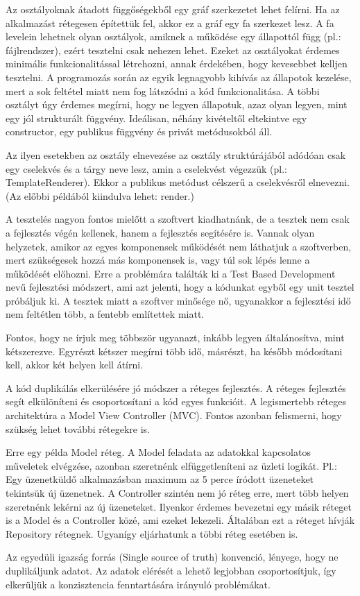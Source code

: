 \documentclass[a4paper,12pt,oneside]{report}
\begin{document}
\begin{justify}
	Az osztályoknak átadott függőségekből egy gráf szerkezetet lehet felírni. Ha az alkalmazást rétegesen építettük fel, akkor ez a gráf egy fa szerkezet lesz. A fa levelein lehetnek olyan osztályok, amiknek a működése egy állapottól függ (pl.: fájlrendszer), ezért tesztelni csak nehezen lehet. Ezeket az osztályokat érdemes minimális funkcionalitással létrehozni, annak érdekében, hogy kevesebbet kelljen tesztelni. A programozás során az egyik legnagyobb kihívás az állapotok kezelése, mert a sok feltétel miatt nem fog látszódni a kód funkcionalitása. A többi osztályt úgy érdemes megírni, hogy ne legyen állapotuk, azaz olyan legyen, mint egy jól strukturált függvény. Ideálisan, néhány kivételtől eltekintve egy constructor, egy publikus függvény és privát metódusokból áll. 

	Az ilyen esetekben az osztály elnevezése az osztály struktúrájából adódóan csak egy cselekvés és a tárgy neve lesz, amin a cselekvést végezzük (pl.: TemplateRenderer). Ekkor a publikus metódust célszerű a cselekvésről elnevezni. (Az előbbi példából kiindulva lehet: render.) 

	A tesztelés nagyon fontos mielőtt a szoftvert kiadhatnánk, de a tesztek nem csak a fejlesztés végén kellenek, hanem a fejlesztés segítésére is. Vannak olyan helyzetek, amikor az egyes komponensek működését nem láthatjuk a szoftverben, mert szükségesek hozzá más komponensek is, vagy túl sok lépés lenne a működését előhozni. Erre a problémára találták ki a Test Based Development nevű fejlesztési módszert, ami azt jelenti, hogy a kódunkat egyből egy unit tesztel próbáljuk ki. A tesztek miatt a szoftver minősége nő, ugyanakkor a fejlesztési idő nem feltétlen több, a fentebb említettek miatt.

	Fontos, hogy ne írjuk meg többször ugyanazt, inkább legyen általánosítva, mint kétszerezve. Egyrészt kétszer megírni több idő, másrészt, ha később módosítani kell, akkor két helyen kell átírni. 

    A kód duplikálás elkerülésére jó módszer a réteges fejlesztés. A réteges fejlesztés segít elkülöníteni és csoportosítani a kód egyes funkcióit. A legismertebb réteges architektúra a Model View Controller (MVC). Fontos azonban felismerni, hogy szükség lehet további rétegekre is. 
    
    Erre egy példa Model réteg. A Model feladata az adatokkal kapcsolatos műveletek elvégzése, azonban szeretnénk elfüggetleníteni az üzleti logikát. Pl.: Egy üzenetküldő alkalmazásban maximum az 5 perce íródott üzeneteket tekintsük új üzenetnek. A Controller szintén nem jó réteg erre, mert több helyen szeretnénk lekérni az új üzeneteket. Ilyenkor érdemes bevezetni egy másik réteget is a Model és a Controller közé, ami ezeket lekezeli. Általában ezt a réteget hívják Repository rétegnek. Ugyanígy eljárhatunk a többi réteg esetében is.

	Az egyedüli igazság forrás (Single source of truth) konvenció, lényege, hogy ne duplikáljunk adatot. Az adatok elérését a lehető legjobban csoportosítjuk, így elkerüljük a konzisztencia fenntartására irányuló problémákat.



\end{justify}
\newpage
\end{document}
